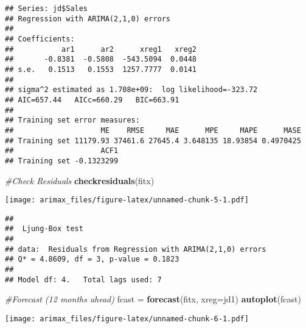 \documentclass[]{article}
\newenvironment{Shaded}{\begin{snugshade}}{\end{snugshade}}
\newcommand{\KeywordTok}[1]{\textcolor[rgb]{0.13,0.29,0.53}{\textbf{#1}}}
\newcommand{\DataTypeTok}[1]{\textcolor[rgb]{0.13,0.29,0.53}{#1}}
\newcommand{\StringTok}[1]{\textcolor[rgb]{0.31,0.60,0.02}{#1}}
\newcommand{\CommentTok}[1]{\textcolor[rgb]{0.56,0.35,0.01}{\textit{#1}}}
\newcommand{\NormalTok}[1]{#1}
\begin{document}
\begin{verbatim}
## Series: jd$Sales 
## Regression with ARIMA(2,1,0) errors 
## 
## Coefficients:
##           ar1      ar2      xreg1   xreg2
##       -0.8381  -0.5808  -543.5094  0.0448
## s.e.   0.1513   0.1553  1257.7777  0.0141
## 
## sigma^2 estimated as 1.708e+09:  log likelihood=-323.72
## AIC=657.44   AICc=660.29   BIC=663.91
## 
## Training set error measures:
##                    ME    RMSE     MAE      MPE     MAPE      MASE
## Training set 11179.93 37461.6 27645.4 3.648135 18.93854 0.4970425
##                    ACF1
## Training set -0.1323299
\end{verbatim}

\begin{Shaded}
\begin{Highlighting}[]
\CommentTok{#Check Residuals }
\KeywordTok{checkresiduals}\NormalTok{(fitx)}
\end{Highlighting}
\end{Shaded}

\texttt{[image: arimax\_files/figure-latex/unnamed-chunk-5-1.pdf]}

\begin{verbatim}
## 
##  Ljung-Box test
## 
## data:  Residuals from Regression with ARIMA(2,1,0) errors
## Q* = 4.8609, df = 3, p-value = 0.1823
## 
## Model df: 4.   Total lags used: 7
\end{verbatim}

\begin{Shaded}
\begin{Highlighting}[]
\CommentTok{#Forecast (12 months ahead)}
\NormalTok{fcast =}\StringTok{ }\KeywordTok{forecast}\NormalTok{(fitx, }\DataTypeTok{xreg=}\NormalTok{jd1)}
\KeywordTok{autoplot}\NormalTok{(fcast)}
\end{Highlighting}
\end{Shaded}

\texttt{[image: arimax\_files/figure-latex/unnamed-chunk-6-1.pdf]}
\end{document}
